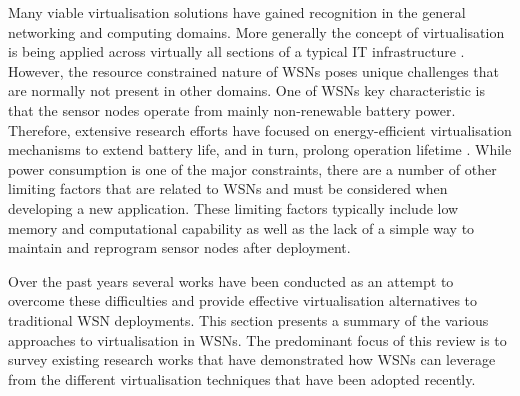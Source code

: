 Many viable virtualisation solutions have gained recognition in the general networking \cite{6272301} and computing \cite{6008687} domains. More generally the concept of virtualisation is being applied across virtually all sections of a typical IT infrastructure \cite{murphy2008virtualization}. However, the resource constrained nature of WSNs poses unique challenges that are normally not present in other domains. One of WSNs key characteristic is that the sensor nodes operate from mainly non-renewable battery power. Therefore, extensive research efforts have focused on energy-efficient virtualisation mechanisms to extend battery life, and in turn, prolong operation lifetime \cite{Hong:2012:TEE:2388871.2388872}.  While power consumption is one of the major constraints, there are a number of other limiting factors that are related to WSNs and must be considered when developing a new application.  These limiting factors typically include low memory and computational capability as well as the lack of a simple way to maintain and reprogram sensor nodes after deployment. 

Over the past years several works have been conducted as an attempt to overcome these difficulties and provide effective virtualisation alternatives to traditional WSN deployments. This section presents a summary of the various approaches to virtualisation in WSNs. The predominant focus of this review is to survey existing research works that have demonstrated how WSNs can leverage from the different virtualisation techniques that have been adopted recently. 


 
